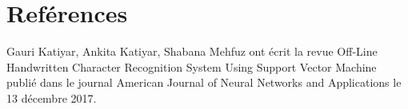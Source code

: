 \documentclass[12pt, letterpaper]{article}
\begin{document}
\section{Reférences}
\par [1] Gauri Katiyar, Ankita Katiyar, Shabana Mehfuz ont écrit la revue Off-Line Handwritten Character Recognition System Using Support Vector Machine publié dans le journal  American Journal of Neural Networks and Applications le 13 décembre 2017.


\newpage
\printbibliography
\end{document}
